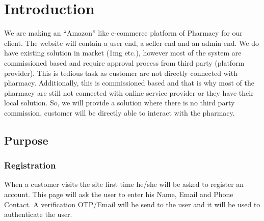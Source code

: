 \documentclass[fleqn,10pt]{../SelfArx} %
\affiliation{\textit{D-Enigma (Group - CS 01)}} %
\affiliation{\textit{Indian Institute of Information Technology, Vadodara.}} %
\begin{document}
\sffamily
\flushbottom %

\maketitle %

\tableofcontents %

\thispagestyle{empty} %


\section{Introduction} %

We are making an “Amazon” like e-commerce platform of Pharmacy for our client. The website will contain a user end, a seller end and an admin end. We do have existing solution in market (1mg etc.), however most of the system are commissioned based and require approval process from third party (platform provider). This is tedious task as customer are not directly connected with pharmacy. Additionally, this is commissioned based and that is why most of the pharmacy are still not connected with online service provider or they have their local solution. So, we will provide a solution where there is no third party commission, customer will be directly able to interact with the pharmacy.


\subsection{Purpose}


\subsubsection{Registration}

When a customer visits the site first time he/she will be asked to register an account. This page will ask the user to enter his Name, Email and Phone Contact. A verification OTP/Email will be send to the user and it will be used to authenticate the user.
\end{document}
